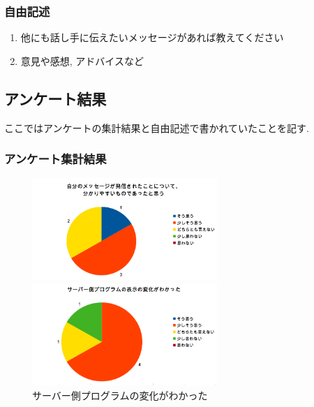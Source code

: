 \documentclass{funthesis}
\begin{document}
\subsubsection{自由記述}
\begin{enumerate}
 \item 他にも話し手に伝えたいメッセージがあれば教えてください
 \item 意見や感想, アドバイスなど
\end{enumerate}


\subsection{アンケート結果}
ここではアンケートの集計結果と自由記述で書かれていたことを記す. 

\subsubsection{アンケート集計結果}
\begin{figure}[H]
 \begin{minipage}{0.5\hsize}
  \begin{center}
  \includegraphics[width=70mm]{./img/question1.png}
  \end{center}
  \caption{自分のメッセージが発信されたこと\newline についてわかりやすかったと思う}
  \label{question1}
 \end{minipage}
 \begin{minipage}{0.5\hsize}
  \begin{center}
  \includegraphics[width=70mm]{./img/question2.png}
  \end{center}
  \caption{サーバー側プログラムの変化\newline がわかった}
  \label{question2}
  \end{minipage}
  \end{figure}
\end{document}
